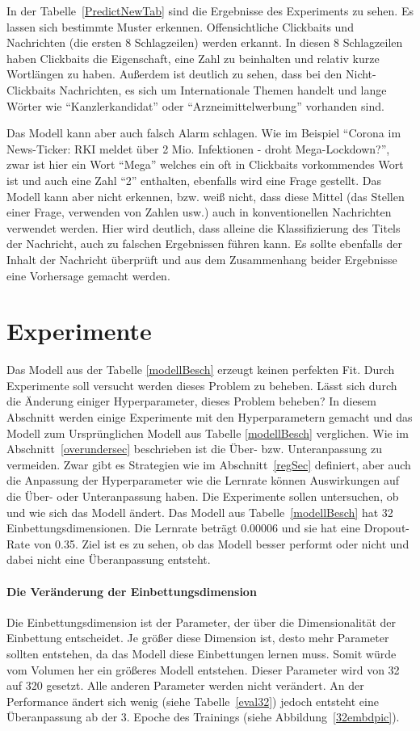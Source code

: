 In der Tabelle~\ref{PredictNewTab} sind die Ergebnisse des Experiments zu sehen. Es lassen sich bestimmte Muster erkennen. Offensichtliche Clickbaits und Nachrichten (die ersten 8 Schlagzeilen) werden erkannt. In diesen 8 Schlagzeilen haben Clickbaits die Eigenschaft, eine Zahl zu beinhalten und relativ kurze Wortlängen zu haben. Außerdem ist deutlich zu sehen, dass bei den Nicht-Clickbaits Nachrichten, es sich um Internationale Themen handelt und lange Wörter wie \enquote{Kanzlerkandidat} oder \enquote{Arzneimittelwerbung} vorhanden sind.

Das Modell kann aber auch falsch Alarm schlagen. Wie im Beispiel \enquote{Corona im News-Ticker: RKI meldet über 2 Mio. Infektionen - droht Mega-Lockdown?}, zwar ist hier ein Wort \enquote{Mega} welches ein oft in Clickbaits vorkommendes Wort ist und auch eine Zahl \enquote{2} enthalten, ebenfalls wird eine Frage gestellt. Das Modell kann aber nicht erkennen, bzw. weiß nicht, dass diese Mittel (das Stellen einer Frage, verwenden von Zahlen usw.) auch in konventionellen Nachrichten verwendet werden. Hier wird deutlich, dass alleine die Klassifizierung des Titels der Nachricht, auch zu falschen Ergebnissen führen kann. Es sollte ebenfalls der Inhalt der Nachricht überprüft und aus dem Zusammenhang beider Ergebnisse eine Vorhersage gemacht werden. 
\section{Experimente}
Das Modell aus der Tabelle \ref{modellBesch} erzeugt keinen perfekten Fit. Durch Experimente soll versucht werden dieses Problem zu beheben. Lässt sich durch die Änderung einiger Hyperparameter, dieses Problem beheben? In diesem Abschnitt werden einige Experimente mit den Hyperparametern gemacht und das Modell zum Ursprünglichen Modell aus Tabelle \ref{modellBesch} verglichen. Wie im Abschnitt~\ref{overundersec} beschrieben ist die Über- bzw. Unteranpassung zu vermeiden. Zwar gibt es Strategien wie im Abschnitt~\ref{regSec} definiert, aber auch die Anpassung der Hyperparameter wie die Lernrate können Auswirkungen auf die Über- oder Unteranpassung haben. Die Experimente sollen untersuchen, ob und wie sich das Modell ändert. Das Modell aus Tabelle~\ref{modellBesch} hat 32 Einbettungsdimensionen. Die Lernrate beträgt 0.00006 und sie hat eine Dropout-Rate von 0.35. Ziel ist es zu sehen, ob das Modell besser performt oder nicht und dabei nicht eine Überanpassung entsteht. 

\paragraph{Die Veränderung der Einbettungsdimension}
Die Einbettungsdimension ist der Parameter, der über die Dimensionalität der Einbettung entscheidet. Je größer diese Dimension ist, desto mehr Parameter sollten entstehen, da das Modell diese Einbettungen lernen muss. Somit würde vom Volumen her ein größeres Modell entstehen. Dieser Parameter wird von 32 auf 320 gesetzt. Alle anderen Parameter werden nicht verändert. An der Performance ändert sich wenig (siehe Tabelle~\ref{eval32}) jedoch entsteht eine Überanpassung ab der 3. Epoche des Trainings (siehe Abbildung~\ref{32embdpic}).

